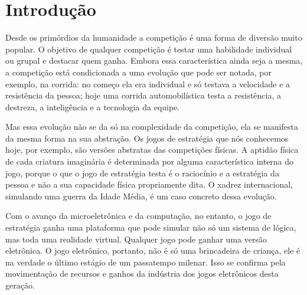 \chapter{Introdução}
\label{cap:introducao}
%
Desde os primórdios da humanidade a competição é uma forma de diversão muito popular. O objetivo de qualquer competição é testar uma habilidade individual ou grupal e destacar quem ganha. Embora essa característica ainda seja a mesma, a competição está condicionada a uma evolução que pode ser notada, por exemplo, na corrida: no começo ela era individual e só testava a velocidade e a resistência da pessoa; hoje uma corrida automobilística testa a resistência, a destreza, a inteligência e a tecnologia da equipe.

Mas essa evolução não se da só na complexidade da competição, ela se manifesta da mesma forma na sua abstração. Os jogos de estratégia que nós conhecemos hoje, por exemplo, são versões abstratas das competições físicas. A aptidão física de cada criatura imaginária é determinada por alguma característica interna do jogo, porque o que o jogo de estratégia testa é o raciocínio e a estratégia da pessoa e não a sua capacidade física propriamente dita. O xadrez internacional, simulando uma guerra da Idade Média, é um caso concreto dessa evolução.

Com o avanço da microeletrônica e da computação, no entanto, o jogo de estratégia ganha uma plataforma que pode simular não só um sistema de lógica, mas toda uma realidade virtual. Qualquer jogo pode ganhar uma versão eletrônica. O jogo eletrônico, portanto, não é só uma brincadeira de criança, ele é na verdade o último estágio de um passatempo milenar. Isso se confirma pela movimentação de recursos e ganhos da indústria dos jogos eletrônicos desta geração.
%
%
